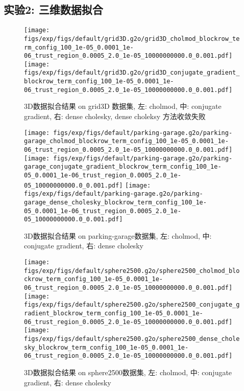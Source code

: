 \documentclass{ctexart}
\begin{document}
\subsection{实验2: 三维数据拟合}


\begin{figure}[!htbp]
	\centering
	\texttt{[image: figs/exp/figs/default/grid3D.g2o/grid3D\_cholmod\_blockrow\_term\_config\_100\_1e-05\_0.0001\_1e-06\_trust\_region\_0.0005\_2.0\_1e-05\_10000000000.0\_0.001.pdf]}
	\texttt{[image: figs/exp/figs/default/grid3D.g2o/grid3D\_conjugate\_gradient\_blockrow\_term\_config\_100\_1e-05\_0.0001\_1e-06\_trust\_region\_0.0005\_2.0\_1e-05\_10000000000.0\_0.001.pdf]}
	\caption{3D数据拟合结果 on grid3D 数据集, 左: cholmod, 中: conjugate gradient, 右: dense cholesky, dense choleksy 方法收敛失败}\label{exp_grid3d}
\end{figure}

\begin{figure}[!htbp]
	\centering
	\texttt{[image: figs/exp/figs/default/parking-garage.g2o/parking-garage\_cholmod\_blockrow\_term\_config\_100\_1e-05\_0.0001\_1e-06\_trust\_region\_0.0005\_2.0\_1e-05\_10000000000.0\_0.001.pdf]}
	\texttt{[image: figs/exp/figs/default/parking-garage.g2o/parking-garage\_conjugate\_gradient\_blockrow\_term\_config\_100\_1e-05\_0.0001\_1e-06\_trust\_region\_0.0005\_2.0\_1e-05\_10000000000.0\_0.001.pdf]}
	\texttt{[image: figs/exp/figs/default/parking-garage.g2o/parking-garage\_dense\_cholesky\_blockrow\_term\_config\_100\_1e-05\_0.0001\_1e-06\_trust\_region\_0.0005\_2.0\_1e-05\_10000000000.0\_0.001.pdf]}
	\caption{3D数据拟合结果 on parking-garage数据集, 左: cholmod, 中: conjugate gradient, 右: dense cholesky}\label{exp_parking_garage}
\end{figure}


\begin{figure}[!htbp]
	\centering
	\texttt{[image: figs/exp/figs/default/sphere2500.g2o/sphere2500\_cholmod\_blockrow\_term\_config\_100\_1e-05\_0.0001\_1e-06\_trust\_region\_0.0005\_2.0\_1e-05\_10000000000.0\_0.001.pdf]}
	\texttt{[image: figs/exp/figs/default/sphere2500.g2o/sphere2500\_conjugate\_gradient\_blockrow\_term\_config\_100\_1e-05\_0.0001\_1e-06\_trust\_region\_0.0005\_2.0\_1e-05\_10000000000.0\_0.001.pdf]}
	\texttt{[image: figs/exp/figs/default/sphere2500.g2o/sphere2500\_dense\_cholesky\_blockrow\_term\_config\_100\_1e-05\_0.0001\_1e-06\_trust\_region\_0.0005\_2.0\_1e-05\_10000000000.0\_0.001.pdf]}
	\caption{3D数据拟合结果 on sphere2500数据集, 左: cholmod, 中: conjugate gradient, 右: dense cholesky}\label{exp_sphere2500}
\end{figure}
\end{document}

